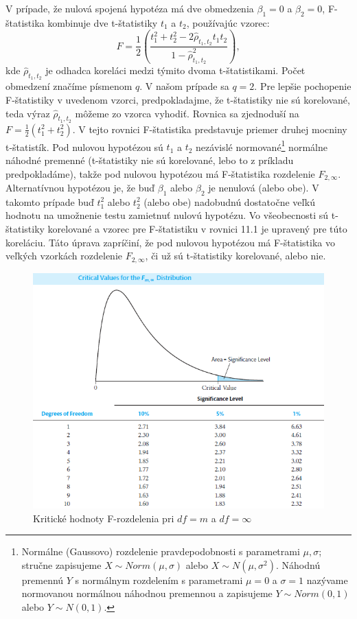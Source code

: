 \documentclass[]{tukediphc}
\begin{document}
V prípade, že nulová spojená hypotéza má dve obmedzenia $\beta_{1} = 0$ a $\beta_{2} = 0$, F-štatistika kombinuje dve t-štatistiky $t_1$ a $t_2$, používajúc vzorec:
\begin{equation}
    F = \frac{1}{2}\left(\frac{t_{1}^2+t_{2}^2-2{{\hat\rho_{t_{1},t_{2}}}}t_{1}t_{2}}{1-\hat{\rho}_{t_{1},t_{2}}^2}\right),
\end{equation}
kde $\hat\rho_{t_{1},t_{2}}$ je odhadca koreláci medzi týmito dvoma t-štatistikami. Počet obmedzení značíme písmenom $q$. V našom prípade sa $q = 2$. 
Pre lepšie pochopenie F-štatistiky v uvedenom vzorci, predpokladajme, že t-štatistiky nie sú korelované, teda výraz $\hat\rho_{t_{1},t_{2}}$ môžeme zo vzorca vyhodiť. Rovnica sa zjednoduší na $F = \frac{1}{2}(t^2_{1} + t^2_{2})$. V tejto rovnici F-štatistika predstavuje priemer druhej mocniny t-štatistík. Pod nulovou hypotézou sú $t_1$ a $t_2$ nezávislé normované\footnote{Normálne (Gaussovo) rozdelenie pravdepodobnosti s parametrami $\mu, \sigma$; stručne zapisujeme $X \sim Norm(\mu,\sigma)$ alebo $X \sim N(\mu, \sigma^2)$. Náhodnú premennú $Y$ s normálnym rozdelením s parametrami $\mu =0$ a $\sigma =1$ nazývame normovanou normálnou náhodnou premennou a zapisujeme $Y \sim Norm(0,1)$ alebo $Y \sim N(0,1)$.} normálne náhodné premenné (t-štatistiky nie sú korelované, lebo to z príkladu predpokladáme), takže pod nulovou hypotézou má F-štatistika rozdelenie $F_{2,\infty}$. Alternatívnou hypotézou je, že buď $\beta_{1}$ alebo $\beta_{2}$ je nenulová (alebo obe). V takomto prípade buď $t^2_{1}$ alebo $t^2_{2}$ (alebo obe) nadobudnú dostatočne veľkú hodnotu na umožnenie testu zamietnuť nulovú hypotézu. Vo všeobecnosti sú t-štatistiky korelované a vzorec pre F-štatistiku v rovnici 11.1 je upravený pre túto koreláciu. Táto úprava zapríčiní, že pod nulovou hypotézou má F-štatistika vo veľkých vzorkách rozdelenie $F_{2,\infty}$, či už sú t-štatistiky korelované, alebo nie. 
\begin{figure}[!ht] 
    \centering 
    \includegraphics[scale = 0.8]{diplomka obrazky/14.png} 
    \caption{Kritické hodnoty F-rozdelenia pri $df = m$ a $df = \infty$} 
\end{figure} 
\end{document}
